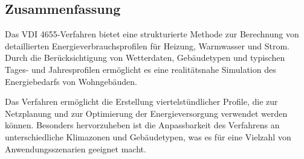 \subsection{Zusammenfassung}
Das VDI 4655-Verfahren bietet eine strukturierte Methode zur Berechnung von detaillierten Energieverbrauchsprofilen für Heizung, Warmwasser und Strom. Durch die Berücksichtigung von Wetterdaten, Gebäudetypen und typischen Tages- und Jahresprofilen ermöglicht es eine realitätsnahe Simulation des Energiebedarfs von Wohngebäuden.

Das Verfahren ermöglicht die Erstellung viertelstündlicher Profile, die zur Netzplanung und zur Optimierung der Energieversorgung verwendet werden können. Besonders hervorzuheben ist die Anpassbarkeit des Verfahrens an unterschiedliche Klimazonen und Gebäudetypen, was es für eine Vielzahl von Anwendungsszenarien geeignet macht.